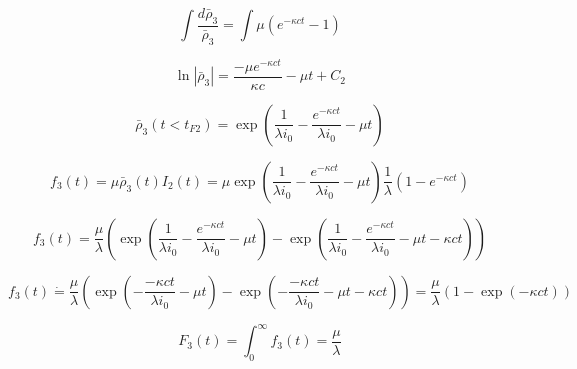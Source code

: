 $$\int \frac{d{\bar \rho_3}}{\bar \rho_3} = \int \mu ( e^{-\kappa c t} -1)$$

$$\ln|\bar{\rho}_3| = \frac{- \mu e^{-\kappa c t}}{\kappa c} - \mu t + C_2$$

$$\bar \rho_3(t<t_{F2}) = \exp\left( \frac{1}{\lambda i_0} - \frac{e^{-\kappa c t}}{\lambda i_0}-\mu t\right)$$


$$f_3(t) = \mu \bar \rho_3(t)I_2(t) = \mu \exp\left( \frac{1}{\lambda i_0} - \frac{e^{-\kappa c t}}{\lambda i_0}-\mu t\right) \frac{1}{\lambda}\left(1-e^{-\kappa c t}\right)$$

$$f_3(t) = \frac{\mu}{\lambda} \left( \exp\left( \frac{1}{\lambda i_0} - \frac{e^{-\kappa c t}}{\lambda i_0}-\mu t\right) - \exp\left( \frac{1}{\lambda i_0} - \frac{e^{-\kappa c t}}{\lambda i_0}-\mu t - \kappa c t\right) \right)$$

$$f_3(t) \dot{=} \frac{\mu}{\lambda} \left( \exp\left( - \frac{{-\kappa c t}}{\lambda i_0}-\mu t\right) - \exp\left(  - \frac{{-\kappa c t}}{\lambda i_0}-\mu t - \kappa c t\right) \right) 
= \frac{\mu}{\lambda}\left( 1 - \exp\left(- \kappa c t\right)\right)$$

$$F_3(t) = \int_0^\infty f_3(t) = \frac{\mu}{\lambda} $$
